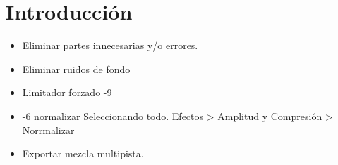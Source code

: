 


\section{Introducción}

\begin{itemize}
	\item Eliminar partes innecesarias y/o errores.
	\item Eliminar ruidos de fondo
 \item Limitador forzado -9
 \item -6 normalizar Seleccionando todo. Efectos > Amplitud y Compresión > Norrmalizar
 \item Exportar mezcla multipista.
\end{itemize}